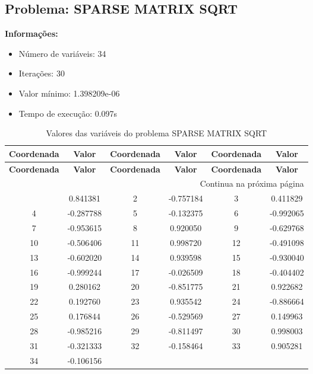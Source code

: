 \documentclass[12pt]{article}
\begin{document}
\newpage            
\subsection{Problema: SPARSE MATRIX SQRT}

\textbf{Informações:}
\begin{itemize}
\item Número de variáveis: 34
\item Iterações: 30
\item Valor mínimo: 1.398209e-06
\item Tempo de execução: 0.097s
\end{itemize}

\small
\begin{longtable}{@{}cc|cc|cc@{}}
\caption{Valores das variáveis do problema SPARSE MATRIX SQRT} \\
\toprule
\textbf{Coordenada} & \textbf{Valor} & \textbf{Coordenada} & \textbf{Valor} & \textbf{Coordenada} & \textbf{Valor} \\
\midrule
\endfirsthead

\toprule
\textbf{Coordenada} & \textbf{Valor} & \textbf{Coordenada} & \textbf{Valor} & \textbf{Coordenada} & \textbf{Valor} \\
\midrule
\endhead

\midrule \multicolumn{6}{r}{{Continua na próxima página}} \\ \midrule
\endfoot

\bottomrule
\endlastfoot
1 & 0.841381 & 2 & -0.757184 & 3 & 0.411829 \\
4 & -0.287788 & 5 & -0.132375 & 6 & -0.992065 \\
7 & -0.953615 & 8 & 0.920050 & 9 & -0.629768 \\
10 & -0.506406 & 11 & 0.998720 & 12 & -0.491098 \\
13 & -0.602020 & 14 & 0.939598 & 15 & -0.930040 \\
16 & -0.999244 & 17 & -0.026509 & 18 & -0.404402 \\
19 & 0.280162 & 20 & -0.851775 & 21 & 0.922682 \\
22 & 0.192760 & 23 & 0.935542 & 24 & -0.886664 \\
25 & 0.176844 & 26 & -0.529569 & 27 & 0.149963 \\
28 & -0.985216 & 29 & -0.811497 & 30 & 0.998003 \\
31 & -0.321333 & 32 & -0.158464 & 33 & 0.905281 \\
34 & -0.106156 &  &  &  &  \\

\end{longtable}
\end{document}
